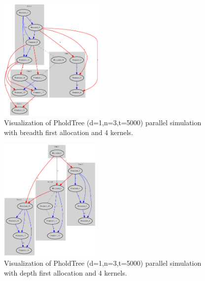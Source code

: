 \begin{figure}
	\center
	\includegraphics[width=\plotfraction\columnwidth,  height=6cm, keepaspectratio]{fig/pholdtreed1n3t5000c4BFS.eps}
	\caption{Visualization of PholdTree (d=1,n=3,t=5000) parallel simulation with breadth first allocation and 4 kernels.}
	\label{fig:pholdtree_visualize_parBFS}
\end{figure}
\begin{figure}
	\center
	\includegraphics[width=\plotfraction\columnwidth,  height=6cm, keepaspectratio]{fig/pholdtreed1n3t5000c4DFS.eps}
	\caption{Visualization of PholdTree (d=1,n=3,t=5000) parallel simulation with depth first allocation and 4 kernels.}
	\label{fig:pholdtree_visualize_parDFS}
\end{figure}